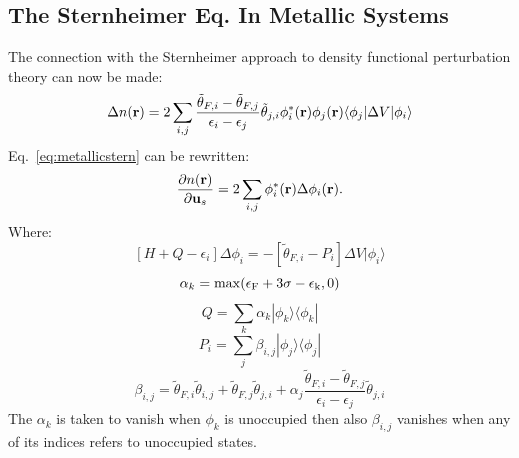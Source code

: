 \documentclass{article}
\def\r{{\bf r}}
\def\u{{\bf u}}
\def\bra{\langle}
\def\ket{\rangle}
\begin{document}
\subsection{The Sternheimer Eq. In Metallic Systems}
The connection with the Sternheimer approach to density functional perturbation theory can now
be made:
%
\begin{equation}
\label{eq:metallicstern}
\Delta n(\r) = 2 \sum_{i,j} \frac{\tilde{\theta}_{F,i} - \tilde{\theta}_{F,j}}{\epsilon_{i} - \epsilon_{j}}
\tilde{\theta}_{j,i}\phi^{*}_{i}(\r)\phi_{j}(\r) \bra\phi_{j}|\Delta V|\phi_{i}\ket
\end{equation}
%
Eq.~\ref{eq:metallicstern} can be rewritten:
%
\begin{equation}
\label{eq:nr}
\frac{\partial n(\r)}{\partial \u_{s}} = 2 \sum_{i,j} \phi^{*}_{i}(\r) \Delta \phi_{i}(\r).
\end{equation}
%
Where: 
%
\begin{equation}
\left[H + Q - \epsilon_{i}\right]\Delta \phi_{i} = -\left[\tilde{\theta}_{F,i}-P_{i}\right]\Delta V|\phi_{i}\ket
\end{equation}
%
\begin{equation}
\alpha_{k} = \rm{max}(\epsilon_{F} + 3\sigma -\epsilon_{k},0)
\end{equation}
%
\begin{equation}
Q=\sum_{k}\alpha_{k}|\phi_{k}\ket\bra\phi_{k}|
\end{equation}
%
\begin{equation}
P_{i} = \sum_{j} \beta_{i,j}|\phi_{j}\ket\bra\phi_{j}|
\end{equation}
%
\begin{equation}
\beta_{i,j} = \tilde{\theta}_{F,i}\tilde{\theta}_{i,j} + 
\tilde{\theta}_{F,j}\tilde{\theta}_{j,i} + 
\alpha_{j}\frac{\tilde{\theta}_{F,i}-\tilde{\theta}_{F,j}}{\epsilon_{i}-\epsilon_{j}}\tilde{\theta}_{j,i}
\end{equation}
%
The $\alpha_{k}$ is taken to vanish when $\phi_{k}$ is unoccupied then
also $\beta_{i,j}$ vanishes when any of its indices
refers to unoccupied states.
\end{document}
